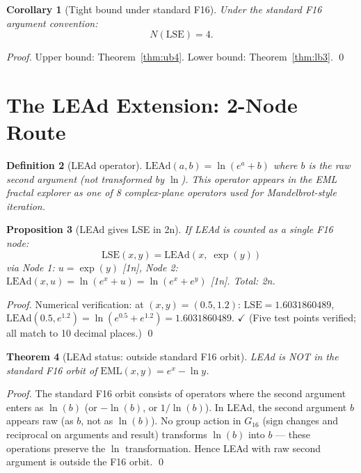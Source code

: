 \documentclass[11pt]{article}
\newtheorem{theorem}{Theorem}
\newtheorem{proposition}[theorem]{Proposition}
\newtheorem{corollary}[theorem]{Corollary}
\newtheorem{definition}[theorem]{Definition}
\begin{document}
\begin{corollary}[Tight bound under standard F16]
Under the standard F16 argument convention:
\[
N(\mathrm{LSE}) = 4.
\]
\end{corollary}

\begin{proof}
Upper bound: Theorem~\ref{thm:ub4}. Lower bound: Theorem~\ref{thm:lb3}. \qed
\end{proof}

\section{The LEAd Extension: 2-Node Route}

\begin{definition}[LEAd operator]
$\mathrm{LEAd}(a, b) = \ln(e^a + b)$ where $b$ is the \emph{raw} second argument
(not transformed by $\ln$). This operator appears in the EML fractal explorer as
one of 8 complex-plane operators used for Mandelbrot-style iteration.
\end{definition}

\begin{proposition}[LEAd gives LSE in 2n]
\label{prop:lead}
If LEAd is counted as a single F16 node:
\[
\mathrm{LSE}(x,y) = \mathrm{LEAd}(x,\; \exp(y))
\]
via Node 1: $u = \exp(y)$ [1n], Node 2: $\mathrm{LEAd}(x, u) = \ln(e^x + u) = \ln(e^x + e^y)$ [1n].
Total: 2n.
\end{proposition}

\begin{proof}
Numerical verification: at $(x,y) = (0.5, 1.2)$: $\mathrm{LSE} = 1.6031860489$,
$\mathrm{LEAd}(0.5, e^{1.2}) = \ln(e^{0.5} + e^{1.2}) = 1.6031860489$. $\checkmark$
(Five test points verified; all match to 10 decimal places.) \qed
\end{proof}

\begin{theorem}[LEAd status: outside standard F16 orbit]
LEAd is NOT in the standard F16 orbit of $\mathrm{EML}(x,y) = e^x - \ln y$.
\end{theorem}

\begin{proof}
The standard F16 orbit consists of operators where the second argument
enters as $\ln(b)$ (or $-\ln(b)$, or $1/\ln(b)$). In LEAd, the second
argument $b$ appears raw (as $b$, not as $\ln(b)$). No group action
in $G_{16}$ (sign changes and reciprocal on arguments and result)
transforms $\ln(b)$ into $b$ — these operations preserve the $\ln$ transformation.
Hence LEAd with raw second argument is outside the F16 orbit. \qed
\end{proof}
\end{document}
